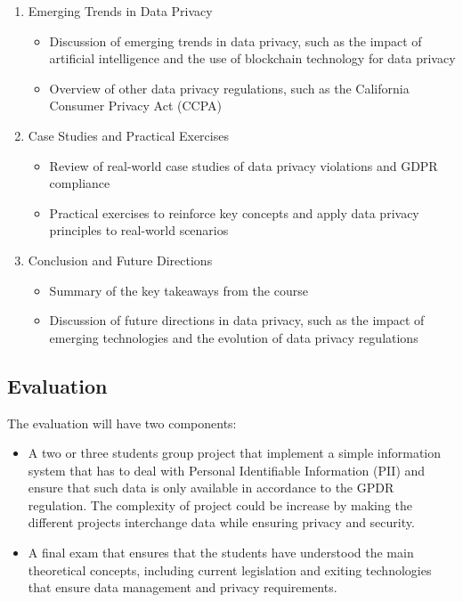 \documentclass[11pt]{article}
\begin{document}
\begin{enumerate}
    \begin{itemize}
        \item Overview of the challenges associated with implementing data privacy in information systems
        \item Explanation of techniques for data anonymization and pseudonymization
        \item Overview of best practices for securing personal data, such as encryption, access controls, and auditing
    \end{itemize}
    \item Emerging Trends in Data Privacy
    \begin{itemize}
        \item Discussion of emerging trends in data privacy, such as the impact of artificial intelligence and the use of blockchain technology for data privacy
        \item Overview of other data privacy regulations, such as the California Consumer Privacy Act (CCPA)
    \end{itemize}
\item Case Studies and Practical Exercises
\begin{itemize}
    \item Review of real-world case studies of data privacy violations and GDPR compliance
    \item Practical exercises to reinforce key concepts and apply data privacy principles to real-world scenarios
\end{itemize}
\item Conclusion and Future Directions
\begin{itemize}
    \item Summary of the key takeaways from the course
    \item Discussion of future directions in data privacy, such as the impact of emerging technologies and the evolution of data privacy regulations
\end{itemize}
    
\end{enumerate}

\subsection{Evaluation}

The evaluation will have two components:
\begin{itemize}
    \item A two or three students group project that implement a simple information system that has to deal with Personal Identifiable Information (PII) and ensure that such data is only available in accordance to the GPDR regulation. The complexity of project could be increase by making the different projects interchange data while ensuring privacy and security.
    \item A final exam that ensures that the students have understood the main theoretical concepts, including current legislation and exiting technologies that ensure data management and privacy requirements.
\end{itemize}
\end{document}
